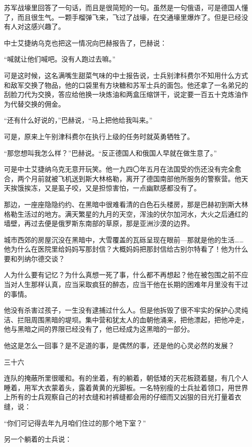 苏军战壕里回答了一句话，而且是很简短的一句。虽然是一句俄语，可是德国人懂了，而且很生气。一颗手榴弹飞来，飞过了战壕，在交通壕里爆炸了。但是已经没有人对这感兴趣了。

中士艾捷纳乌克也把这一情况向巴赫报告了，巴赫说：

“喊就让他们喊吧。没有人跑过去嘛。”

可是这时候，这名满嘴生甜菜气味的中士报告说，士兵别津科费尔不知用什么方式和敌军交换了物品，他的口袋里有方块糖和苏军士兵的面包。他还拿了一名弟兄的刮脸刀代为交换，答应给他换一块炼油和两盒压缩饼干，说定要一百五十克炼油作为代替交换的佣金。

“还有什么好说的，”巴赫说，“马上把他给我叫来。”

可是，原来上午别津科费尔在执行上级的任务时就英勇牺牲了。

“那您想叫我怎么样？”巴赫说。“反正德国人和俄国人早就在做生意了。”

可是中士艾捷纳乌克无意开玩笑。他一九四〇年五月在法国受的伤还没有完全愈合，两个月前就被飞机送到斯大林格勒，离开了德国南部他所服务的警察营。他天天挨饿挨冻，又是虱子咬，又是担惊害怕，一点幽默感都没有了。

那边，一座座隐隐约约、在黑暗中很难看清的白色石头楼房，那是巴赫初到斯大林格勒生活过的地方。满天繁星的九月的天空，浑浊的伏尔加河水，大火之后通红的墙壁，再过去便是俄罗斯东南部的草原，那是亚洲沙漠的边界。

城市西郊的房屋沉没在黑暗中，大雪覆盖的瓦砾呈现在眼前—那就是他的生活……他为什么在医院里给妈妈写那封信？大概妈妈把那封信给古别尔特看了！他为什么要和列纳尔德交谈？

人为什么要有记忆？为什么真想一死了事，什么都不再想起？他在被包围之前不应当对人生那样认真，应当采取疯狂的醉态，应当干他在长期的困难年月里没有干过的事情。

他没有杀害过孩子，一生没有逮捕过什么人。但是他拆毁了很不牢实的保护心灵纯洁、拦阻周围黑暗的堤坝。集中营和犹太人的血朝他涌来，把他漂起，把他冲走，他与黑暗之间的界限已经没有了，他已经成为这黑暗的一部分。

他这是怎么一回事？是不足道的事，是偶然的事，还是他的心灵必然的发展？

三十六

连队的掩蔽所里很暖和。有的坐着，有的躺着，朝低矮的天花板跷着腿，有几个人睡着，用军大衣蒙着头，露着黄黄的光脚板。一名特别瘦的士兵扯着领口，用世界上所有的士兵观察自己的衬衣缝和衬裤缝都会用的仔细而又凶狠的目光打量着衣缝，说：

“你们可记得去年九月咱们住过的那个地下室？”

另一个躺着的士兵说：

